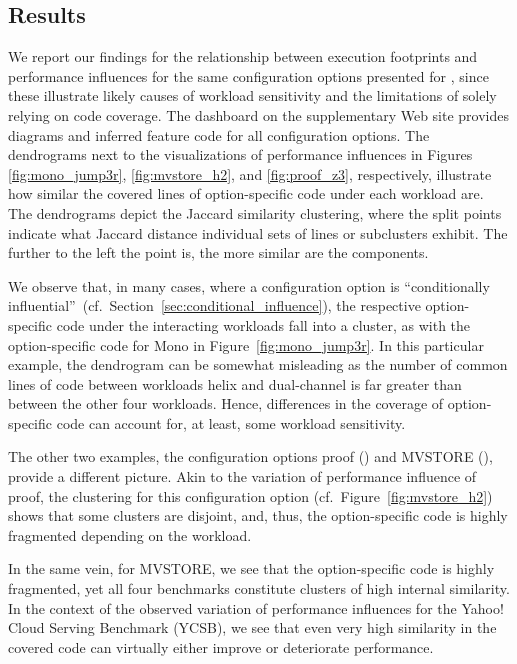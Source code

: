 {{{\subsection{Results}\label{sec:results3}
We report our findings for the relationship between execution footprints and performance influences for the same configuration options presented for , since these illustrate likely causes of workload sensitivity and the limitations of solely relying on code coverage. The dashboard on the supplementary Web site provides diagrams and inferred feature code for all configuration options. The dendrograms next to the visualizations of performance influences in Figures \ref{fig:mono_jump3r}, \ref{fig:mvstore_h2}, and \ref{fig:proof_z3}, respectively, illustrate how similar the covered lines of option-specific code under each workload are. 
The dendrograms depict the Jaccard similarity clustering, where the split points indicate what Jaccard distance individual sets of lines or subclusters exhibit. The further to the left the point is, the more similar are the components.

We  observe that, in many cases, where  a configuration option is ``conditionally influential''~(cf.~Section~\ref{sec:conditional_influence}), the respective option-specific code under the interacting workloads fall into a cluster, as with the option-specific code for \textsf{Mono} in Figure~\ref{fig:mono_jump3r}. In this particular example, the dendrogram can be somewhat misleading as the number of common lines of code between workloads helix and dual-channel is far greater than between the other four workloads. Hence, differences in the coverage of option-specific code can account for, at least, some workload sensitivity.


The other two examples, the configuration options \textsf{proof} (\zdrei) and \textsf{MVSTORE} (\htwo), provide a different picture. Akin to the variation of performance influence of \textsf{proof}, the clustering for this configuration option (cf.~Figure~\ref{fig:mvstore_h2}) shows that some clusters are disjoint, and, thus, the option-specific code is highly fragmented depending on the workload. 

In the same vein, for \textsf{MVSTORE}, we see that the option-specific code is highly fragmented, yet all four benchmarks constitute clusters of high internal similarity. In the context of the observed variation of performance influences for the Yahoo! Cloud Serving Benchmark (YCSB), we see that even very high similarity in the covered code can virtually either improve or deteriorate performance.

}}}
